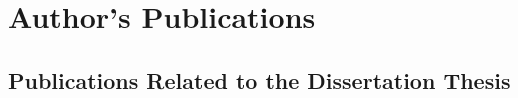 \chapter{Author's Publications}




\newcommand{\auth}\textbf
\newcommand{\core}[3]{\href{https://portal.core.edu.au/conf-ranks/#3/}{CORE#1 conference rank: #2}}
\newcommand{\wos}[1]{\href{https://www.webofscience.com/wos/woscc/full-record/WOS:#1}{Web of Science record: #1}}
\newcommand{\citations}[4]{\href{https://scholar.google.com/scholar?cites=#4}{Number of citations\footnote{Source: \href{https://scholar.google.com/}{Google Scholar}. Date extracted: \formatdate{11}{9}{2024}. Excluding self-citations.}\todo{Join duplicate footnotes.}\todo{Unfiy the date format with the rest of the document.}: #2}}


\section{Publications Related to the Dissertation Thesis}


